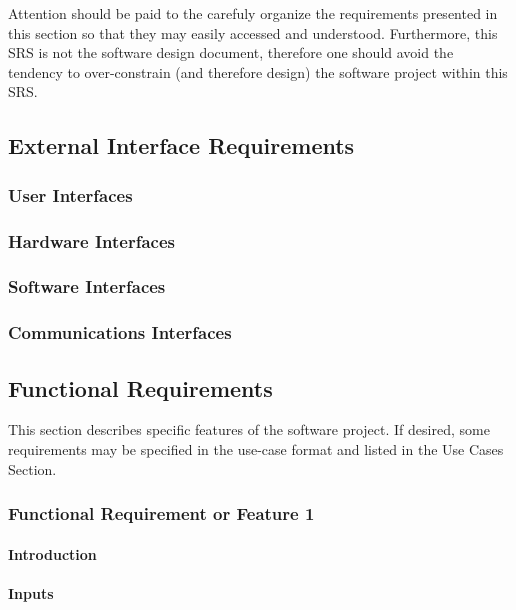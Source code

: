 \documentclass[titlepage]{article}
\begin{document}
Attention should be paid to the carefuly organize the requirements presented in this section so that they may easily accessed and understood.  Furthermore, this SRS is not the software design document, therefore one should avoid the tendency to over-constrain (and therefore design) the software project within this SRS.

\subsection{External Interface Requirements}

\subsubsection{User Interfaces}

\subsubsection{Hardware Interfaces}

\subsubsection{Software Interfaces}

\subsubsection{Communications Interfaces}

\subsection{Functional Requirements}
This section describes specific features of the software project.  If desired, some requirements may be specified in the use-case format and listed in the Use Cases Section.

\subsubsection{Functional Requirement or Feature 1}

\paragraph{Introduction}

\paragraph{Inputs}
\end{document}
